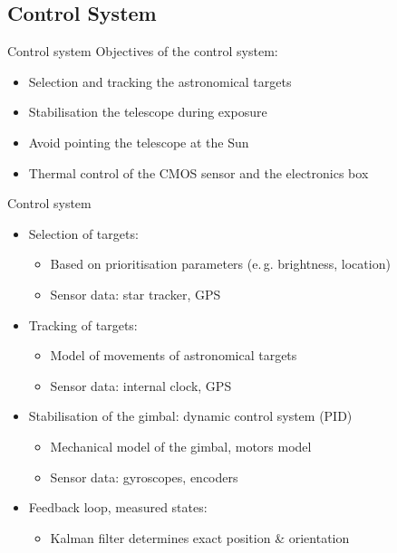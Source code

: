 \documentclass[11pt, aspectratio=169]{beamer}
\begin{document}
\subsection{Control System}

\begin{frame}{Control system}
    Objectives of the control system:
    \begin{itemize}
        \item Selection and tracking the astronomical targets
        \item Stabilisation the telescope during exposure
        \item Avoid pointing the telescope at the Sun
        \item Thermal control of the CMOS sensor and the electronics box
    \end{itemize}
\end{frame}

\begin{frame}{Control system}
    \begin{itemize}
        \item<1-> Selection of targets: %
        \begin{itemize}
            \item Based on prioritisation parameters (e.\,g. brightness, location)
            \item Sensor data: star tracker, GPS %
        \end{itemize}
        \item<2-> Tracking of targets: 
        \begin{itemize}
            \item Model of movements of astronomical targets
            \item Sensor data: internal clock, GPS
        \end{itemize}
        \item<3-> Stabilisation of the gimbal: dynamic control system (PID) %
        \begin{itemize}
            \item Mechanical model of the gimbal, motors model
            \item Sensor data: gyroscopes, encoders%
        \end{itemize}
        \item<4-> Feedback loop, measured states: 
        \begin{itemize}
            \item Kalman filter determines exact position \& orientation
        \end{itemize}
    \end{itemize}
\end{frame}
\end{document}

